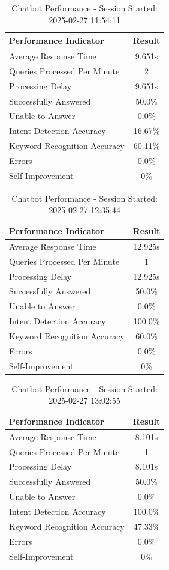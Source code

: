 \begin{table}[h!]
\centering
\caption{Chatbot Performance - Session Started: 2025-02-27 11:54:11}
\begin{tabular}{|l|c|}
\hline
\textbf{Performance Indicator} & \textbf{Result} \\
\hline
Average Response Time & 9.651s \\
Queries Processed Per Minute & 2 \\
Processing Delay & 9.651s \\
Successfully Answered & 50.0\% \\
Unable to Answer & 0.0\% \\
Intent Detection Accuracy & 16.67\% \\
Keyword Recognition Accuracy & 60.11\% \\
Errors & 0.0\% \\
Self-Improvement & 0\% \\
\hline
\end{tabular}
\end{table}

\begin{table}[h!]
\centering
\caption{Chatbot Performance - Session Started: 2025-02-27 12:35:44}
\begin{tabular}{|l|c|}
\hline
\textbf{Performance Indicator} & \textbf{Result} \\
\hline
Average Response Time & 12.925s \\
Queries Processed Per Minute & 1 \\
Processing Delay & 12.925s \\
Successfully Answered & 50.0\% \\
Unable to Answer & 0.0\% \\
Intent Detection Accuracy & 100.0\% \\
Keyword Recognition Accuracy & 60.0\% \\
Errors & 0.0\% \\
Self-Improvement & 0\% \\
\hline
\end{tabular}
\end{table}


\begin{table}[h!]
\centering
\caption{Chatbot Performance - Session Started: 2025-02-27 13:02:55}
\begin{tabular}{|l|c|}
\hline
\textbf{Performance Indicator} & \textbf{Result} \\
\hline
Average Response Time & 8.101s \\
Queries Processed Per Minute & 1 \\
Processing Delay & 8.101s \\
Successfully Answered & 50.0\% \\
Unable to Answer & 0.0\% \\
Intent Detection Accuracy & 100.0\% \\
Keyword Recognition Accuracy & 47.33\% \\
Errors & 0.0\% \\
Self-Improvement & 0\% \\
\hline
\end{tabular}
\end{table}

